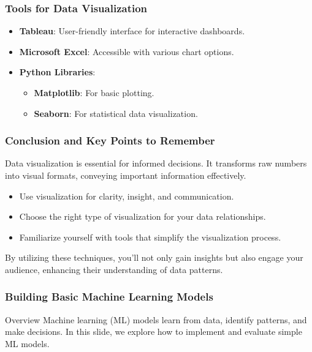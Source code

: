 \documentclass[aspectratio=169]{beamer}
\begin{document}
\begin{frame}[fragile]
    \frametitle{Tools for Data Visualization}
    \begin{itemize}
        \item \textbf{Tableau}: User-friendly interface for interactive dashboards.
        \item \textbf{Microsoft Excel}: Accessible with various chart options.
        \item \textbf{Python Libraries}:
            \begin{itemize}
                \item \textbf{Matplotlib}: For basic plotting.
                \item \textbf{Seaborn}: For statistical data visualization.
            \end{itemize}
    \end{itemize}
\end{frame}

\begin{frame}[fragile]
    \frametitle{Conclusion and Key Points to Remember}
    Data visualization is essential for informed decisions. It transforms raw numbers into visual formats, conveying important information effectively.
    
    \begin{itemize}
        \item Use visualization for clarity, insight, and communication.
        \item Choose the right type of visualization for your data relationships.
        \item Familiarize yourself with tools that simplify the visualization process.
    \end{itemize}
    
    By utilizing these techniques, you'll not only gain insights but also engage your audience, enhancing their understanding of data patterns.
\end{frame}

\begin{frame}
    \frametitle{Building Basic Machine Learning Models}
    \begin{block}{Overview}
        Machine learning (ML) models learn from data, identify patterns, and make decisions. 
        In this slide, we explore how to implement and evaluate simple ML models.
    \end{block}
\end{frame}
\end{document}
